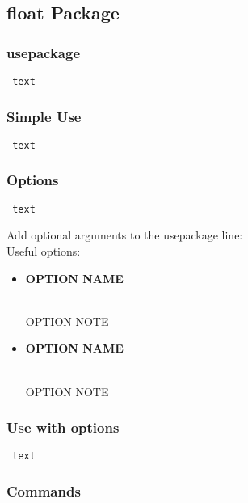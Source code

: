 \documentclass[class=article , crop=false, titlepage, twoside, multi={itemize, figure, verbatim}, float=false]{standalone}
\title{}  %
\begin{document}
\ifstandalone
\maketitle %
\clearpage
\tableofcontents %
\clearpage
\fi

\clearpage

\subsection[float Package]{\LARGE float Package}

\subsubsection[usepackage]{\Large usepackage}
\begin{verbatim} text \end{verbatim}

\subsubsection[Simple Use]{\Large Simple Use}
\begin{verbatim} text \end{verbatim}

\subsubsection[Options]{\Large Options}
\begin{verbatim} text \end{verbatim}
Add optional arguments to the usepackage line:\\
Useful options:\begin{itemize}
\item \begin{large}\textbf{OPTION NAME}\end{large}\\OPTION NOTE
\item \begin{large}\textbf{OPTION NAME}\end{large}\\OPTION NOTE
\end{itemize}

\subsubsection[Use with Options]{\Large Use with options}
\begin{verbatim} text \end{verbatim}

\subsubsection[Commands]{\Large Commands}
\end{document}
